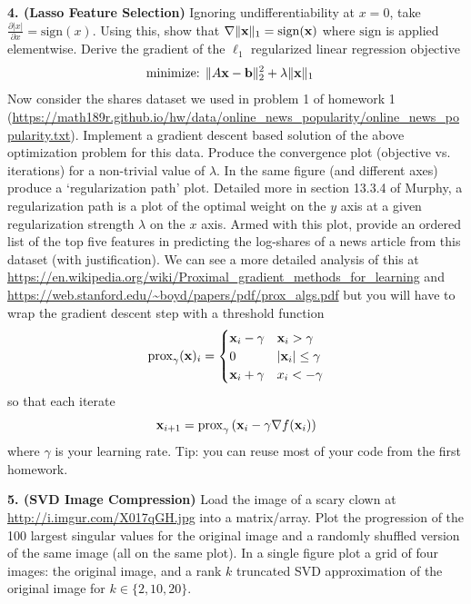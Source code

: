 \documentclass[12pt,letterpaper,fleqn]{hmcpset}
\begin{document}
\textbf{4. (Lasso Feature Selection)} Ignoring undifferentiability at $x=0$, take $\frac{\partial |x|}{\partial x}
= \mathrm{sign} (x)$. Using this, show that $\nabla \|{\bf x}\|_1 = \mathrm{sign}({\bf x})$ where $\mathrm{sign}$ is applied
elementwise. Derive the gradient of the $\ell_1$ regularized linear regression objective
\begin{align*}
    \text{minimize: } & \|A{\bf x} - {\bf b}\|_2^2 + \lambda \|{\bf x}\|_1
\end{align*}
Now consider the shares dataset we used in problem 1 of homework 1
(\url{https://math189r.github.io/hw/data/online_news_popularity/online_news_popularity.txt}).
Implement a gradient descent based solution of the above optimization problem for this data. Produce
the convergence plot (objective vs. iterations) for a non-trivial value of $\lambda$.
In the same figure (and different axes) produce a `regularization path' plot. Detailed
more in section 13.3.4 of Murphy, a regularization path is a plot of the optimal weight on
the $y$ axis at a given regularization strength $\lambda$ on the $x$ axis. Armed with this
plot, provide an ordered list of the top five features in predicting the log-shares of a news
article from this dataset (with justification). We can see a more detailed analysis of this
at \url{https://en.wikipedia.org/wiki/Proximal_gradient_methods_for_learning} and
\url{https://web.stanford.edu/~boyd/papers/pdf/prox_algs.pdf} but you will have to wrap
the gradient descent step with a threshold function
\[
    \mathrm{prox}_{\gamma}({\bf x})_i = \begin{cases}
        {\bf x}_i - \gamma & {\bf x}_i > \gamma\\
        0 & |{\bf x}_i| \leq \gamma\\
        {\bf x}_i + \gamma & x_i < -\gamma
    \end{cases}
\]
so that each iterate
\[
    {\bf x}_{i+1} = \mathrm{prox}_{\gamma}\left( {\bf x}_i - \gamma \nabla f({\bf x}_i) \right)
\]
where $\gamma$ is your learning rate. Tip: you can reuse most of your code from the
first homework.\\[1em]

\begin{solution}
    
\end{solution}

\newpage

\textbf{5. (SVD Image Compression)} Load the image of a scary clown at \url{http://i.imgur.com/X017qGH.jpg}
into a matrix/array. Plot the progression of the 100 largest singular values for the original image
and a randomly shuffled version of the same image (all on the same plot). In a single figure plot
a grid of four images: the original image, and a rank $k$ truncated SVD approximation of the original
image for $k\in\{2,10,20\}$.\\[1em]
\end{document}

